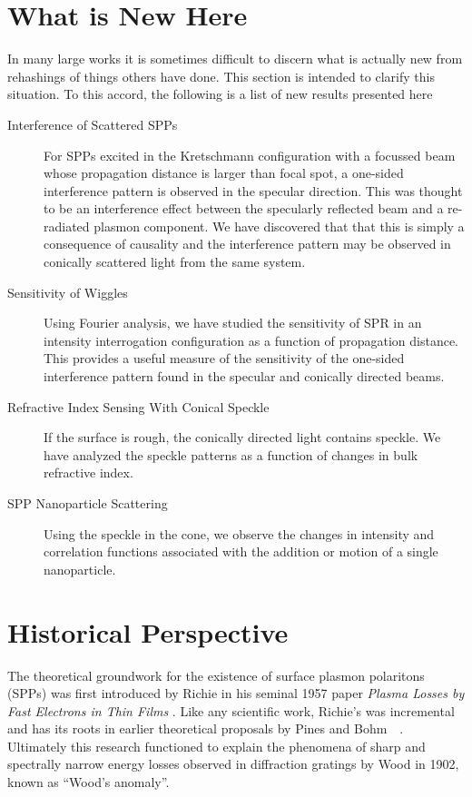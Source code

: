 \documentclass[a4paper,titlepage,onecolumn]{report}
\begin{document}
\section{What is New Here}
In many large works it is sometimes difficult to discern what is actually
new from rehashings of things others have done.  This section is intended
to clarify this situation.  To this accord, the following is a list of new
results presented here
\begin{description}
\item[Interference of Scattered SPPs]
For SPPs excited in the Kretschmann configuration with a focussed beam
whose propagation distance is larger than focal spot, a one-sided
interference pattern is observed in the specular direction.  This was
thought to be an interference effect between the specularly reflected beam
and a re-radiated plasmon component.  We have discovered that that this is
simply a consequence of causality and the interference pattern may be
observed in conically scattered light from the same system.
\item[Sensitivity of Wiggles] 
Using Fourier analysis, we have studied the sensitivity of SPR in an intensity
interrogation configuration as a function of propagation distance.  This
provides a useful measure of the sensitivity of the one-sided interference
pattern found in the specular and conically directed beams.
\item[Refractive Index Sensing With Conical Speckle]
If the surface is rough, the conically directed light contains speckle.  We
have analyzed the speckle patterns as a function of changes in bulk
refractive index.
\item[SPP Nanoparticle Scattering]
Using the speckle in the cone, we observe the changes in intensity and
correlation functions associated with the addition or motion of a single
nanoparticle.
\end{description}

\section{Historical Perspective}
The theoretical groundwork for the existence of surface plasmon polaritons
(SPPs) was first introduced by Richie in his seminal 1957 paper
\textit{Plasma Losses by Fast Electrons in Thin Films}
\cite{ritchie1957plasma}.  Like any scientific work, Richie's was
incremental and has its roots in earlier theoretical proposals by Pines and
Bohm~\cite{bohm1951collective}~\cite{pines1952collective}.  Ultimately this
research functioned to explain the phenomena of sharp and spectrally narrow
energy losses observed in diffraction gratings by Wood in 1902, known as
``Wood's anomaly''.
\end{document}
